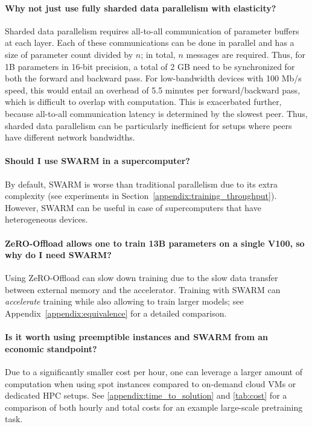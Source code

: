 \paragraph{Why not just use fully sharded data parallelism with elasticity?}

Sharded data parallelism requires all-to-all communication of parameter buffers at each layer. Each of these communications can be done in parallel and has a size of parameter count divided by $n$; in total, $n$ messages are required. Thus, for 1B parameters in 16-bit precision, a total of 2 GB need to be synchronized for both the forward and backward pass. For low-bandwidth devices with 100 Mb/s speed, this would entail an overhead of 5.5 minutes per forward/backward pass, which is difficult to overlap with computation. This is exacerbated further, because all-to-all communication latency is determined by the slowest peer. Thus, sharded data parallelism can be particularly inefficient for setups where peers have different network bandwidths.

\paragraph{Should I use SWARM in a supercomputer?}
By default, SWARM is worse than traditional parallelism due to its extra complexity (see experiments in Section~\ref{appendix:training_throughput}). However, SWARM can be useful in case of supercomputers that have heterogeneous devices.

\paragraph{ZeRO-Offload allows one to train 13B parameters on a single V100, so why do I need SWARM?}

Using ZeRO-Offload can slow down training due to the slow data transfer between external memory and the accelerator. Training with SWARM can {\it accelerate} training while also allowing to train larger models; see Appendix~\ref{appendix:equivalence} for a detailed comparison.

\paragraph{Is it worth using preemptible instances and SWARM from an economic standpoint?}
Due to a significantly smaller cost per hour, one can leverage a larger amount of computation when using spot instances compared to on-demand cloud VMs or dedicated HPC setups. See \autoref{appendix:time_to_solution} and \autoref{tab:cost} for a comparison of both hourly and total costs for an example large-scale pretraining task.

